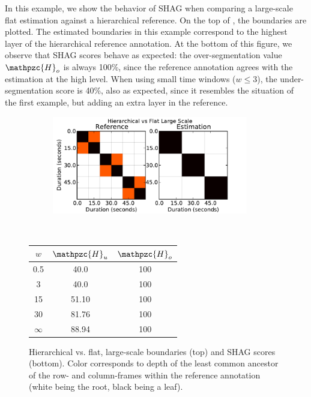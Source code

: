 \documentclass{article}
\def\shag{\ensuremath{\mathpzc{H}}}
\begin{document}
In this example, we show the behavior of SHAG when comparing a large-scale flat estimation against a hierarchical reference.
On the top of , the boundaries are plotted.
The estimated boundaries in this example correspond to the highest layer of the hierarchical reference annotation.
At the bottom of this figure, we observe that SHAG scores behave as expected: the over-segmentation value $\shag_o$ is always 100\%, since the reference annotation agrees with the
estimation at the high level.
When using small time windows ($w \leq 3$), the under-segmentation score is 40\%, also as expected, since it resembles the situation of the first example, but adding an extra layer in the reference.


\begin{figure}
  \centering
  \begin{subfigure}{0.5\textwidth}
    \centering
    \includegraphics[width=0.94\textwidth]{plots/hier-flatlarge.pdf}
  \end{subfigure}%
  \\
  \begin{minipage}{0.5\textwidth}
    \centering
    \vspace{10pt}
    \begin{tabular}{|c|c|c|}
      \hline
      $w$       & $\shag_u$    & $\shag_o$      \\
      \hline
      0.5       & 40.0      & 100      \\     
      3         & 40.0      & 100      \\
      15        & 51.10     & 100    \\
      30        & 81.76     & 100    \\
      $\infty$  & 88.94     & 100    \\
      \hline
    \end{tabular}
  \end{minipage}
  \caption{Hierarchical vs. flat, large-scale boundaries (top) and SHAG scores (bottom).  Color corresponds to depth of the least common ancestor of the row- and column-frames 
  within the reference annotation (white being the root, black being a leaf).}
  \label{fig:hier-flatlarge}
\end{figure}
\end{document}

